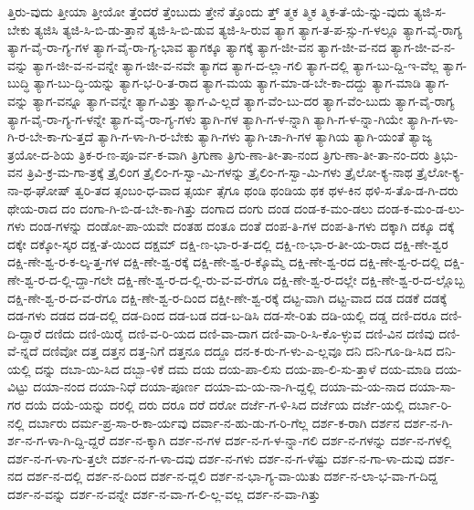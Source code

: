 {ತ್ತಿರು-ವುದು
ತ್ತೀಯಾ
ತ್ತೀಯೋ
ತ್ತೆಂದರೆ
ತ್ತೆಂಬುದು
ತ್ತೇನೆ
ತ್ತೊಂದು
ತ್ತ್
ತ್ಮಕ
ತ್ಮಿಕ
ತ್ಮಿಕ-ತೆ-ಯೆ-ನ್ನು-ವುದು
ತ್ಯಜಿ-ಸ-ಬೇಕು
ತ್ಯಜಿಸಿ
ತ್ಯಜಿ-ಸಿ-ಬಿ-ಡು-ತ್ತಾನೆ
ತ್ಯಜಿ-ಸಿ-ಬಿ-ಡುವ
ತ್ಯಜಿ-ಸಿ-ರುವ
ತ್ಯಾಗ
ತ್ಯಾಗ-ತ-ಪ-ಸ್ಸು-ಗ-ಳಲ್ಲೂ
ತ್ಯಾಗ-ವೈ-ರಾಗ್ಯ
ತ್ಯಾಗ-ವೈ-ರಾ-ಗ್ಯ-ಗಳ
ತ್ಯಾಗ-ವೈ-ರಾ-ಗ್ಯ-ಭಾವ
ತ್ಯಾಗಕ್ಕೂ
ತ್ಯಾಗಕ್ಕೆ
ತ್ಯಾಗ-ಜೀ-ವನ
ತ್ಯಾಗ-ಜೀ-ವ-ನದ
ತ್ಯಾಗ-ಜೀ-ವ-ನ-ವನ್ನು
ತ್ಯಾಗ-ಜೀ-ವ-ನ-ವನ್ನೇ
ತ್ಯಾಗ-ಜೀ-ವ-ನವೇ
ತ್ಯಾಗದ
ತ್ಯಾಗ-ದ-ಲ್ಲಾ-ಗಲಿ
ತ್ಯಾಗ-ದಲ್ಲಿ
ತ್ಯಾಗ-ಬು-ದ್ದಿ-ಇ-ವೆಲ್ಲ
ತ್ಯಾಗ-ಬುದ್ಧಿ
ತ್ಯಾಗ-ಬು-ದ್ಧಿ-ಯನ್ನು
ತ್ಯಾಗ-ಭ-ರಿ-ತ-ರಾದ
ತ್ಯಾಗ-ಮಯ
ತ್ಯಾಗ-ಮಾ-ಡ-ಬೇ-ಕಾ-ದದ್ದು
ತ್ಯಾಗ-ಮಾಡಿ
ತ್ಯಾಗ-ವನ್ನು
ತ್ಯಾಗ-ವನ್ನೂ
ತ್ಯಾಗ-ವನ್ನೇ
ತ್ಯಾಗ-ವಿತ್ತು
ತ್ಯಾಗ-ವಿ-ಲ್ಲದೆ
ತ್ಯಾಗ-ವೆಂ-ಬು-ದರ
ತ್ಯಾಗ-ವೆಂ-ಬುದು
ತ್ಯಾಗ-ವೈ-ರಾಗ್ಯ
ತ್ಯಾಗ-ವೈ-ರಾ-ಗ್ಯ-ಗ-ಳನ್ನೇ
ತ್ಯಾಗ-ವೈ-ರಾ-ಗ್ಯ-ಗಳು
ತ್ಯಾಗಿ-ಗಳ
ತ್ಯಾಗಿ-ಗ-ಳ-ನ್ನಾಗಿ
ತ್ಯಾಗಿ-ಗ-ಳ-ನ್ನಾ-ಗಿಯೇ
ತ್ಯಾಗಿ-ಗ-ಳಾ-ಗಿ-ರ-ಬೇ-ಕಾ-ಗು-ತ್ತದೆ
ತ್ಯಾಗಿ-ಗ-ಳಾ-ಗಿ-ರ-ಬೇಕು
ತ್ಯಾಗಿ-ಗಳು
ತ್ಯಾಗಿ-ಚಾ-ಗಿ-ಗಳ
ತ್ಯಾಗಿಯ
ತ್ಯಾಗಿ-ಯಂತೆ
ತ್ಯಾಜ್ಯ
ತ್ರಯೋ-ದ-ಶಿಯ
ತ್ರಿಕ-ರ-ಣ-ಪೂ-ರ್ವ-ಕ-ವಾಗಿ
ತ್ರಿಗುಣಾ
ತ್ರಿಗು-ಣಾ-ತೀ-ತಾ-ನಂದ
ತ್ರಿಗು-ಣಾ-ತೀ-ತಾ-ನಂ-ದರು
ತ್ರಿಭು-ವನ
ತ್ರಿವಿ-ಕ್ರ-ಮ-ಗಾ-ತ್ರಕ್ಕೆ
ತ್ರೈಲಿಂಗ
ತ್ರೈಲಿಂ-ಗ-ಸ್ವಾ-ಮಿ-ಗಳನ್ನು
ತ್ರೈಲಿಂ-ಗ-ಸ್ವಾ-ಮಿ-ಗಳು
ತ್ರೈಲೋ-ಕ್ಯ-ನಾಥ
ತ್ರೈಲೋ-ಕ್ಯ-ನಾ-ಥ-ಘೋಷ್
ತ್ವರಿ-ತದ
ತ್ಸಂಬಂ-ಧ-ವಾದ
ತ್ಸರ್ಯ
ತ್ಸೆಗೂ
ಥಂಡಿ
ಥಂಡಿಯ
ಥಕ
ಥಳ-ಕಿನ
ಥಳಿ-ಸ-ತೊ-ಡ-ಗಿ-ದರು
ಥೇಯ-ರಾದ
ದಂ
ದಂಗಾ-ಗಿ-ಬಿ-ಡ-ಬೇ-ಕಾ-ಗಿತ್ತು
ದಂಗಾದ
ದಂಗು
ದಂಡ
ದಂಡ-ಕ-ಮಂ-ಡಲು
ದಂಡ-ಕ-ಮಂ-ಡ-ಲು-ಗಳು
ದಂಡ-ಗಳನ್ನು
ದಂಡೋ-ಪಾ-ಯವೇ
ದಂತಹ
ದಂತೂ
ದಂತೆ
ದಂಪ-ತಿ-ಗಳ
ದಂಪ-ತಿ-ಗಳು
ದಕ್ಕಾಗಿ
ದಕ್ಕೂ
ದಕ್ಕೆ
ದಕ್ಕೇ
ದಕ್ಕೋ-ಸ್ಕರ
ದಕ್ಷ-ತೆ-ಯಿಂದ
ದಕ್ಷಮ್
ದಕ್ಷಿ-ಣ-ಭಾ-ರ-ತ-ದಲ್ಲಿ
ದಕ್ಷಿ-ಣ-ಭಾ-ರ-ತೀ-ಯ-ರಾದ
ದಕ್ಷಿ-ಣೇ-ಶ್ವರ
ದಕ್ಷಿ-ಣೇ-ಶ್ವ-ರ-ಕ-ಲ್ಕ-ತ್ತ-ಗಳ
ದಕ್ಷಿ-ಣೇ-ಶ್ವ-ರಕ್ಕೆ
ದಕ್ಷಿ-ಣೇ-ಶ್ವ-ರ-ಕ್ಕೊಮ್ಮೆ
ದಕ್ಷಿ-ಣೇ-ಶ್ವ-ರದ
ದಕ್ಷಿ-ಣೇ-ಶ್ವ-ರ-ದಲ್ಲಿ
ದಕ್ಷಿ-ಣೇ-ಶ್ವ-ರ-ದ-ಲ್ಲಿ-ದ್ದಾ-ಗಲೇ
ದಕ್ಷಿ-ಣೇ-ಶ್ವ-ರ-ದ-ಲ್ಲಿ-ರು-ವ-ವ-ರೆಗೂ
ದಕ್ಷಿ-ಣೇ-ಶ್ವ-ರ-ದಲ್ಲೇ
ದಕ್ಷಿ-ಣೇ-ಶ್ವ-ರ-ದ-ಲ್ಲೊಬ್ಬ
ದಕ್ಷಿ-ಣೇ-ಶ್ವ-ರ-ದ-ವ-ರೆಗೂ
ದಕ್ಷಿ-ಣೇ-ಶ್ವ-ರ-ದಿಂದ
ದಕ್ಷೀ-ಣೇ-ಶ್ವ-ರಕ್ಕೆ
ದಟ್ಟ-ವಾಗಿ
ದಟ್ಟ-ವಾದ
ದಡ
ದಡಕೆ
ದಡಕ್ಕೆ
ದಡ-ಗಳು
ದಡದ
ದಡ-ದಲ್ಲಿ
ದಡ-ದಿಂದ
ದಡ-ಬಡ
ದಡ-ಬ-ಡಿಸಿ
ದಡ-ಸೇ-ರಿತು
ದಡಿ-ಯಲ್ಲಿ
ದಡ್ಡ
ದಣಿ-ದರೂ
ದಣಿ-ದಿ-ದ್ದಾರೆ
ದಣಿದು
ದಣಿ-ಯಿರೈ
ದಣಿ-ವ-ರಿ-ಯದ
ದಣಿ-ವಾ-ದಾಗ
ದಣಿ-ವಾ-ರಿ-ಸಿ-ಕೊ-ಳ್ಳುವ
ದಣಿ-ವಿನ
ದಣಿವು
ದಣಿ-ವೆ-ನ್ನದೆ
ದಣಿವೋ
ದತ್ತ
ದತ್ತನ
ದತ್ತ-ನಿಗೆ
ದತ್ತನೂ
ದದ್ದೂ
ದನ-ಕ-ರು-ಗ-ಳು-ಎ-ಲ್ಲವೂ
ದನಿ
ದನಿ-ಗೂ-ಡಿ-ಸಿದ
ದನಿ-ಯಲ್ಲಿ
ದನ್ನು
ದಬಾ-ಯಿ-ಸಿದ
ದಬ್ಬಾ-ಳಿಕೆ
ದಮ
ದಯ
ದಯ-ಪಾ-ಲಿಸು
ದಯ-ಪಾ-ಲಿ-ಸು-ತ್ತಾಳೆ
ದಯ-ಮಾಡಿ
ದಯ-ವಿಟ್ಟು
ದಯಾ-ನಂದ
ದಯಾ-ನಿಧೆ
ದಯಾ-ಪೂರ್ಣ
ದಯಾ-ಮ-ಯ-ನಾ-ಗಿ-ದ್ದಲ್ಲಿ
ದಯಾ-ಮ-ಯ-ನಾದ
ದಯಾ-ಸಾ-ಗರ
ದಯೆ
ದಯೆ-ಯನ್ನು
ದರಲ್ಲಿ
ದರು
ದರೂ
ದರೆ
ದರೋ
ದರ್ಜೆ-ಗ-ಳಿ-ಸಿದ
ದರ್ಜೆಯ
ದರ್ಜೆ-ಯಲ್ಲಿ
ದರ್ಬಾ-ರಿ-ನಲ್ಲಿ
ದರ್ಬಾರು
ದರ್ಮ-ಪ್ರ-ಸಾ-ರ-ಕಾ-ರ್ಯವು
ದರ್ವಾ-ನ-ಹು-ಡು-ಗ-ರಿ-ಗೆಲ್ಲ
ದರ್ಶ-ಕ-ರಾಗಿ
ದರ್ಶನ
ದರ್ಶ-ನ-ಗಿ-ರ್ಶ-ನ-ಗ-ಳಾ-ಗಿ-ದ್ದಿ-ದ್ದರೆ
ದರ್ಶ-ನ-ಕ್ಕಾಗಿ
ದರ್ಶ-ನ-ಗಳ
ದರ್ಶ-ನ-ಗ-ಳ-ನ್ನಾ-ಗಲಿ
ದರ್ಶ-ನ-ಗಳನ್ನು
ದರ್ಶ-ನ-ಗಳಲ್ಲಿ
ದರ್ಶ-ನ-ಗ-ಳಾ-ಗು-ತ್ತಲೇ
ದರ್ಶ-ನ-ಗ-ಳಾ-ದವು
ದರ್ಶ-ನ-ಗಳು
ದರ್ಶ-ನ-ಗ-ಳೆಷ್ಟು
ದರ್ಶ-ನ-ಗಾ-ಳಾ-ದುವು
ದರ್ಶ-ನದ
ದರ್ಶ-ನ-ದಲ್ಲಿ
ದರ್ಶ-ನ-ದಿಂದ
ದರ್ಶ-ನ-ದ್ಲಲಿ
ದರ್ಶ-ನ-ಭಾ-ಗ್ಯ-ವಾ-ಯಿತು
ದರ್ಶ-ನ-ಲಾ-ಭ-ವಾ-ಗ-ದಿದ್ದ
ದರ್ಶ-ನ-ವನ್ನು
ದರ್ಶ-ನ-ವನ್ನೇ
ದರ್ಶ-ನ-ವಾ-ಗ-ಲಿ-ಲ್ಲ-ವಲ್ಲ
ದರ್ಶ-ನ-ವಾ-ಗಿತ್ತು
}
